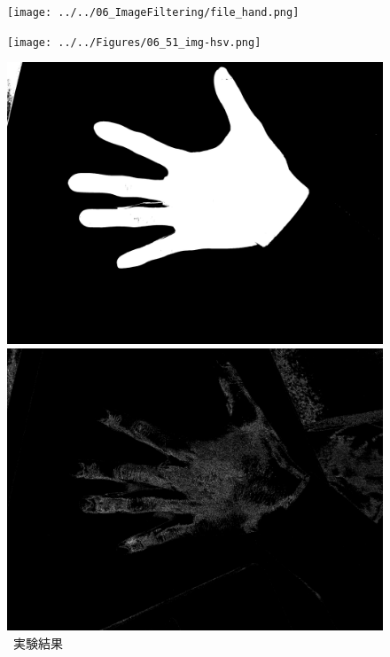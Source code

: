 \begin{figure}[h]
    \centering
    \begin{minipage}[b]{.23\textwidth}
        \centering
        \texttt{[image: ../../06\_ImageFiltering/file\_hand.png]}
    \end{minipage}
    \begin{minipage}[b]{.23\textwidth}
        \centering
        \texttt{[image: ../../Figures/06\_51\_img-hsv.png]}
    \end{minipage}
    \begin{minipage}[b]{.23\textwidth}
        \centering
        \includegraphics[keepaspectratio,width=\textwidth]{../../Figures/06_52_scd.png}
    \end{minipage}
    \begin{minipage}[b]{.23\textwidth}
        \includegraphics[keepaspectratio,width=\textwidth]{../../Figures/06_53_hand.png}
    \end{minipage}
    \caption{\kadaibe\ 実験結果}
\end{figure}